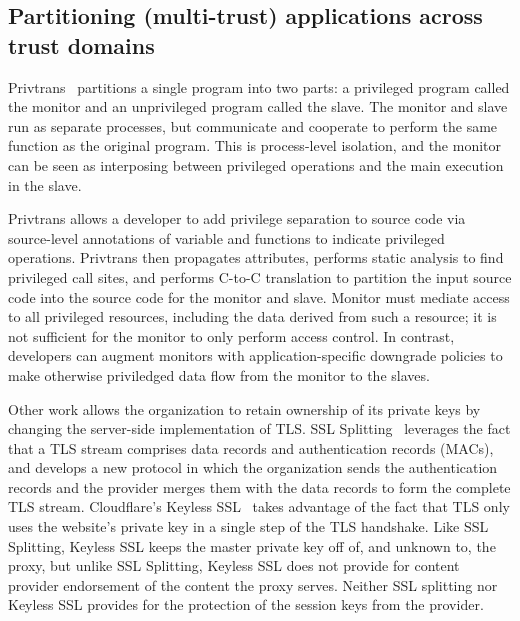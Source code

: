 \subsection{Partitioning (multi-trust) applications across trust domains} 



%
Privtrans~\cite{privtrans} partitions a single program into two parts: a
privileged program called the monitor and an unprivileged program called the
slave. 
%
The monitor and slave run as separate processes, but communicate and cooperate
to perform the same function as the original program.
%
This is process-level isolation, and the monitor can be seen as interposing
between privileged operations and the main execution in the slave.


Privtrans allows a developer to add privilege separation to source code via
source-level annotations of variable and functions to indicate privileged
operations.  
%
Privtrans then propagates attributes, performs static analysis to find
privileged call sites, and performs C-to-C translation to partition the input
source code into the source code for the monitor and slave. 
%
Monitor must mediate access to all privileged resources, including the data
derived from such a resource; it is not sufficient for the monitor to only
perform access control.
%
In contrast, developers can augment monitors with application-specific
downgrade policies to make otherwise priviledged data flow from the monitor to
the slaves.  


%
Other work allows the organization to retain ownership of its private keys by
changing the server-side implementation of TLS\@.
%
SSL Splitting~\cite{ssl-splitting} leverages the fact that a TLS stream
comprises data records and authentication records (MACs), and develops a new
protocol in which the organization sends the authentication records and the
provider merges them with the data records to form the complete TLS stream.
%
Cloudflare's Keyless SSL~\cite{keyless-ssl} takes advantage of the fact that
TLS only uses the website's private key in a single step of the TLS handshake.
%
Like SSL Splitting, Keyless SSL keeps the master private key off of, and unknown
to, the proxy, but unlike SSL Splitting, Keyless SSL does not provide for
content provider endorsement of the content the proxy serves.  
%
Neither SSL splitting nor Keyless SSL provides for the protection of the
session keys from the provider.



